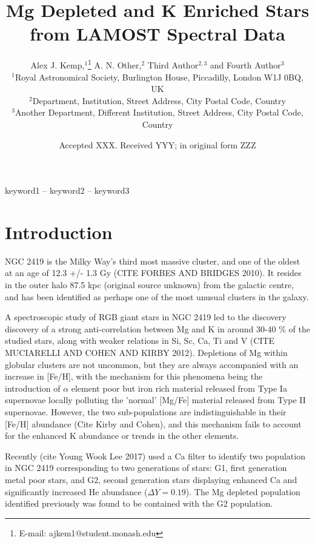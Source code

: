 \documentclass[a4paper,fleqn,usenatbib]{mnras}
\title[Short title, max. 45 characters]{Mg Depleted and K Enriched Stars from LAMOST Spectral Data}
\author[Kemp et al.]{
Alex J. Kemp,$^{1}$\thanks{E-mail: ajkem1@student.monash.edu}
A. N. Other,$^{2}$
Third Author$^{2,3}$
and Fourth Author$^{3}$
\\
$^{1}$Royal Astronomical Society, Burlington House, Piccadilly, London W1J 0BQ, UK\\
$^{2}$Department, Institution, Street Address, City Postal Code, Country\\
$^{3}$Another Department, Different Institution, Street Address, City Postal Code, Country
}
\date{Accepted XXX. Received YYY; in original form ZZZ}
\begin{document}
\label{firstpage}
\pagerange{\pageref{firstpage}--\pageref{lastpage}}
\maketitle

\begin{abstract}

\end{abstract}

\begin{keywords}
keyword1 -- keyword2 -- keyword3
\end{keywords}



\section{Introduction}

NGC 2419 is the Milky Way's third most massive cluster, and one of the oldest at an age of 12.3 +/- 1.3 Gy (CITE FORBES AND BRIDGES 2010). It resides in the outer halo 87.5 kpc (original source unknown) from the galactic centre, and has been identified as perhaps one of the most unusual clusters in the galaxy.

A spectroscopic study of RGB giant stars in NGC 2419 led to the discovery discovery of a strong anti-correlation between Mg and K in around 30-40 \% of the studied stars, along with weaker relations in Si, Sc, Ca, Ti and V (CITE MUCIARELLI AND COHEN AND KIRBY 2012). Depletions of Mg within globular clusters are not uncommon, but they are always accompanied with an increase in [Fe/H], with the mechanism for this phenomena being the introduction of $\alpha$ element poor but iron rich material released from Type Ia supernovae locally polluting the 'normal' [Mg/Fe] material released from Type II supernovae. However, the two sub-populations are indistinguishable in their [Fe/H] abundance (Cite Kirby and Cohen), and this mechanism fails to account for the enhanced K abundance or trends in the other elements. 

Recently (cite Young Wook Lee 2017) used a Ca filter to identify two population in NGC 2419 corresponding to two generations of stars: G1, first generation metal poor stars, and G2, second generation stars displaying enhanced Ca and significantly increased He abundance ($\Delta Y = 0.19$). The Mg depleted population identified previously was found to be contained with the G2 population.
\end{document}
